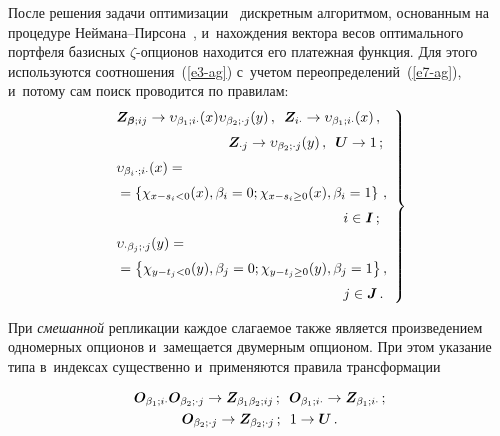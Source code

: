 \begin{multicols}{2}
  После решения задачи оптимизации~\cite{2-ag, 5-ag} дискретным 
алгоритмом, основанным на процедуре Ней\-ма\-на--Пир\-со\-на~\cite{8-ag}, 
и~нахождения вектора весов оптимального портфеля базисных  
$\zeta$-оп\-ци\-о\-нов находится его платежная функция. Для этого 
используются соотношения~(\ref{e3-ag}) с~учетом  
переопределений~(\ref{e7-ag}), и~потому сам поиск проводится по правилам: 
  \begin{equation}
  \left.
  \begin{array}{l}
  \!\!\boldsymbol{Z}_{\boldsymbol{\beta};ij}\to \upsilon_{\beta_1;i\cdot}(x)\upsilon_{\beta_2;\cdot 
j}(y)\,,\enskip  \boldsymbol{Z}_{i\cdot}\to \upsilon_{\beta_1;i\cdot}(x)\,,\\[6pt]
     \hspace*{27mm}\boldsymbol{Z}_{\cdot j}\to 
\upsilon_{\beta_2;\cdot j}(y)\,,\enskip \boldsymbol{U}\to 1\,;\\[6pt]
    \!\!\upsilon_{\beta_i\cdot; i\cdot}(x)={}\\[6pt]
    \!\!{}= \left\{ \chi_{x-s_i<0}(x), \beta_i=0; \chi_{x-s_i\geq0}(x), \beta_i=1\right\}\,,\\[6pt]
\hspace*{56mm} i\in \boldsymbol{I}\,;\\[6pt]
    \!\!\upsilon_{\cdot\beta_j;\cdot j}(y)={}\\[6pt]
    \!\!{}= \left\{ 
  \chi_{y-t_j<0}(y), \beta_j=0; \chi_{y-t_j\geq 0} (y), \beta_j=1\right\}, \\[6pt] 
   \hspace*{56mm}j\in  \boldsymbol{J}\,.
   \end{array}
   \right\}
     \label{e15-ag}
   \end{equation}
  
  При \textit{смешанной} репликации каждое слагаемое также является 
произведением одномерных опционов и~замещается двумерным опционом. При 
этом указание типа в~индексах существенно и~применяются правила 
трансформации

\vspace*{-6pt}

\noindent
  \begin{multline}
  \boldsymbol{O}_{\beta_1;i\cdot} \boldsymbol{O}_{\beta_2;\cdot j}\to 
\boldsymbol{Z}_{\beta_1\beta_2;ij}\,;\enskip
  \boldsymbol{O}_{\beta_1;i\cdot} \to \boldsymbol{Z}_{\beta_1;i\cdot}\,;\\ 
  \boldsymbol{O}_{\beta_2;\cdot j}\to \boldsymbol{Z}_{\beta_2;\cdot j}\,;\enskip 1\to \boldsymbol{U}\,.
  \label{e16-ag}
  \end{multline}
  

\end{multicols}
